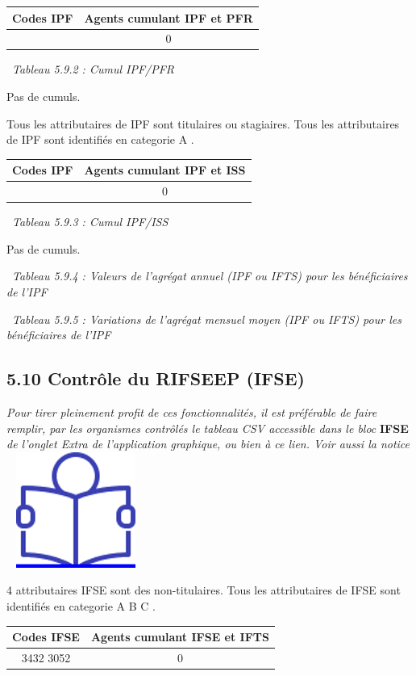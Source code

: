 \begin{longtable}[]{@{}cc@{}}
\toprule
Codes IPF & Agents cumulant IPF et PFR\tabularnewline
\midrule
\endhead
& 0\tabularnewline
\bottomrule
\end{longtable}

~\emph{Tableau 5.9.2 : Cumul IPF/PFR}

Pas de cumuls.

Tous les attributaires de IPF sont titulaires ou stagiaires. Tous les
attributaires de IPF sont identifiés en categorie A .

\begin{longtable}[]{@{}cc@{}}
\toprule
Codes IPF & Agents cumulant IPF et ISS\tabularnewline
\midrule
\endhead
& 0\tabularnewline
\bottomrule
\end{longtable}

~\emph{Tableau 5.9.3 : Cumul IPF/ISS}

Pas de cumuls.

~\emph{Tableau 5.9.4 : Valeurs de l'agrégat annuel (IPF ou IFTS) pour
les bénéficiaires de l'IPF}

~\emph{Tableau 5.9.5 : Variations de l'agrégat mensuel moyen (IPF ou
IFTS) pour les bénéficiaires de l'IPF}

\hypertarget{controle-du-rifseep-ifse}{%
\subsection{5.10 Contrôle du RIFSEEP
(IFSE)}\label{controle-du-rifseep-ifse}}

\emph{Pour tirer pleinement profit de ces fonctionnalités, il est
préférable de faire remplir, par les organismes contrôlés le tableau CSV
accessible dans le bloc} \textbf{IFSE} \emph{de l'onglet Extra de
l'application graphique, ou bien à ce lien. Voir aussi la notice} ~
\href{../Docs/Notices/fiche_tableau_ifse.odt}{\includegraphics{icones/Notice.png}}

4 attributaires IFSE sont des non-titulaires. Tous les attributaires de
IFSE sont identifiés en categorie A B C .

\begin{longtable}[]{@{}cc@{}}
\toprule
Codes IFSE & Agents cumulant IFSE et IFTS\tabularnewline
\midrule
\endhead
3432 3052 & 0\tabularnewline
\bottomrule
\end{longtable}

